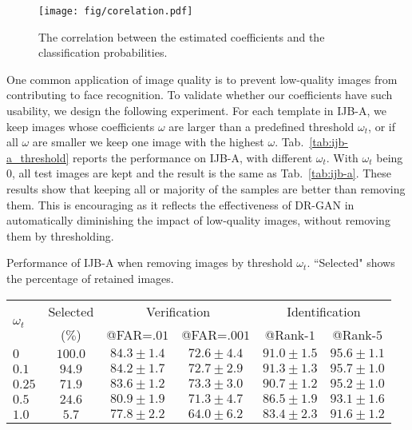 \documentclass[10pt,journal,compsoc]{IEEEtran}
\begin{document}
\begin{figure}[t!]
\begin{center}
\texttt{[image: fig/corelation.pdf]}
\end{center}
\vspace{-1mm}
\caption{The correlation between the estimated coefficients and the classification probabilities.}
\label{fig:coeff_corr}
\end{figure}
One common application of image quality is to prevent low-quality images from contributing to face recognition. 
%
To validate whether our coefficients have such usability, we design the following experiment.
For each template in IJB-A, we keep images whose coefficients $\omega$ are larger than a predefined threshold $\omega_t$, or if all $\omega$ are smaller we keep one image with the highest $\omega$.
%
Tab.~\ref{tab:ijb-a_threshold} reports the performance on IJB-A, with different $\omega_t$. %
With $\omega_t$ being $0$, all test images are kept and the result is the same as Tab.~\ref{tab:ijb-a}. 
%
These results show that keeping all or majority of the samples are better than removing them.
This is encouraging as it reflects the effectiveness of DR-GAN in automatically diminishing the impact of low-quality images, without removing them by thresholding.
\caption{\small{Performance of IJB-A when removing images by threshold $\omega_t$. ``Selected" shows the percentage of retained images.}}
\vspace{-3mm}
\small
\begin{center}
\begin{tabular}{@{\hskip .5mm}l@{\hskip 1.5mm}c@{\hskip 1.5mm}c@{\hskip 1.5mm}c@{\hskip 1.5mm}c@{\hskip 1.5mm}c@{\hskip .5mm}}
\toprule
\multirow{2}{*}{$\omega_t$}& Selected & \multicolumn{2}{c}{Verification} & \multicolumn{2}{c}{Identification} \\ \cmidrule(r){3-4} \cmidrule(r){5-6}
 & ($\%$) & @FAR=$.01$ & @FAR=$.001$ & @Rank-$1$ & @Rank-$5$ \\ \midrule 
$0   $ &$100.0$ & ${\mathbf{84.3}} \pm 1.4$ & $72.6 \pm 4.4$ & $91.0\pm 1.5$ & $95.6\pm1.1$ \\
$0.1 $ &$94.9$ & $84.2 \pm 1.7$ & $72.7 \pm 2.9$ & ${\mathbf{91.3}}\pm 1.3$ & ${\mathbf{95.7}}\pm1.0$ \\
$0.25$ &$71.9$ & $83.6 \pm 1.2$ & ${\mathbf{73.3}} \pm 3.0$ & $90.7\pm 1.2$ & $95.2\pm1.0$ \\
$0.5 $ &$24.6$ & $80.9 \pm 1.9$ & $71.3 \pm 4.7$ & $86.5\pm 1.9$ & $93.1\pm1.6$ \\
$1.0 $ &$5.7$ & $77.8 \pm 2.2$ & $64.0 \pm 6.2$ & $83.4\pm 2.3$ & $91.6\pm 1.2$ \\ \bottomrule
\end{tabular}
\end{center}
\end{document}
